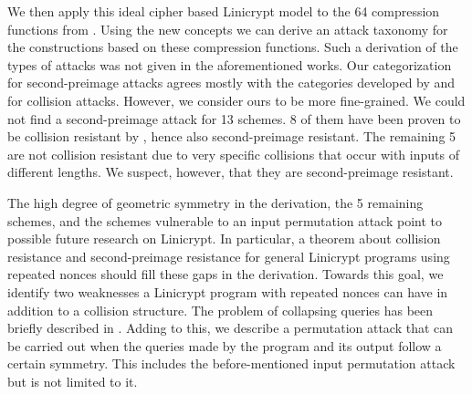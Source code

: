 We then apply this ideal cipher based Linicrypt model to the 64 compression functions from \cite{C:PreGovVan93}.
Using the new concepts we can derive an attack taxonomy for the \MD constructions based on these compression functions.
Such a derivation of the types of attacks was not given in the aforementioned works.
Our categorization for second-preimage attacks agrees mostly with the categories developed by \cite{C:PreGovVan93} and \cite{C:BlaRogShr02} for collision attacks.
However, we consider ours to be more fine-grained.
We could not find a second-preimage attack for 13 schemes.
8 of them have been proven to be collision resistant by \cite{C:BlaRogShr02},
hence also second-preimage resistant.
The remaining 5 are not collision resistant due to very specific collisions that occur with inputs of different lengths.
We suspect, however, that they are second-preimage resistant.

The high degree of geometric symmetry in the derivation,
the 5 remaining schemes, and the schemes vulnerable to an input permutation attack point to possible future research on Linicrypt.
In particular,
a theorem about collision resistance and second-preimage resistance for general Linicrypt programs using repeated nonces should fill these gaps in the derivation.
Towards this goal, we identify two weaknesses a Linicrypt program with repeated nonces can have in addition to a collision structure.
The problem of collapsing queries has been briefly described in \cite{TCC:McQSwoRos19}.
Adding to this, we describe a permutation attack that can be carried out when the queries made by the program and its output follow a certain symmetry.
This includes the before-mentioned input permutation attack but is not limited to it.